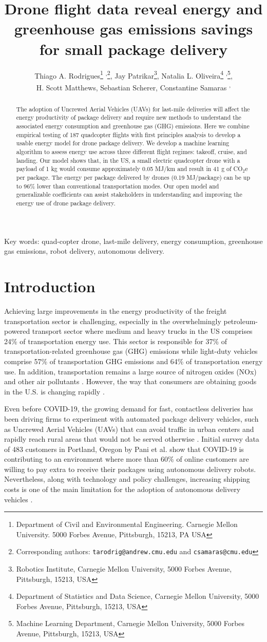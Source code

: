 \documentclass{article}
\title{Drone flight data reveal energy and greenhouse gas emissions savings for small package delivery}
\author{Thiago A. Rodrigues\thanks{Department of Civil and Environmental Engineering. Carnegie Mellon University. 5000 Forbes Avenue, Pittsburgh, 15213, PA USA} \textsuperscript{,}\thanks{Corresponding authors: {\tt\small{tarodrig@andrew.cmu.edu}} and {\tt\small{csamaras@cmu.edu}}}, \;Jay Patrikar\thanks{Robotics Institute, Carnegie Mellon University, 5000 Forbes Avenue, Pittsburgh, 15213, USA}, \;Natalia L. Oliveira\thanks{Department of Statistics and Data Science, Carnegie Mellon University, 5000 Forbes Avenue, Pittsburgh, 15213, USA} \textsuperscript{,}\thanks{Machine Learning Department, Carnegie Mellon University, 5000 Forbes Avenue, Pittsburgh, 15213, USA}, \\H. Scott Matthews\footnotemark[1], \;Sebastian Scherer\footnotemark[3], \;Constantine Samaras \footnotemark[1] \textsuperscript{,} \footnotemark[2]
}
\date{}
\begin{document}
\maketitle

\begin{abstract}
The adoption of Uncrewed Aerial Vehicles (UAVs) for last-mile deliveries will affect the energy productivity of package delivery and require new methods to understand the associated energy consumption and greenhouse gas (GHG) emissions. Here we combine empirical testing of 187 quadcopter flights with first principles analysis to develop a usable energy model for drone package delivery. We develop a machine learning algorithm to assess energy use across three different flight regimes: takeoff, cruise, and landing. Our model shows that, in the US, a small electric quadcopter drone with a payload of 1 kg would consume approximately 0.05 MJ/km and result in 41 g of CO$_{2}$e per package. The energy per package delivered by drones (0.19 MJ/package) can be up to 96\% lower than conventional transportation modes. Our open model and generalizable coefficients can assist stakeholders in understanding and improving the energy use of drone package delivery.
\end{abstract}

Key words: quad-copter drone, last-mile delivery, energy consumption, greenhouse gas emissions, robot delivery, autonomous delivery.

\section{Introduction}

Achieving large improvements in the energy productivity of the freight transportation sector is challenging, especially in the overwhelmingly petroleum-powered transport sector where medium and heavy trucks in the US comprises 24\% of transportation energy use. This sector is responsible for 37\% of transportation-related greenhouse gas (GHG) emissions while light-duty vehicles comprise 57\% of transportation GHG emissions and 64\% of transportation energy use. In addition, transportation remains a large source of nitrogen oxides (NOx) and other air pollutants \cite{Davis2021Transportation39}. However, the way that consumers are obtaining goods in the U.S. is changing rapidly \cite{Dost2018}.

Even before COVID-19, the growing demand for fast, contactless deliveries has been driving firms to experiment with automated package delivery vehicles, such as Uncrewed Aerial Vehicles (UAVs) that can avoid traffic in urban centers and rapidly reach rural areas that would not be served otherwise \cite{Mims2020, Lee2020TheFuture}. Initial survey data of 483 customers in Portland, Oregon by Pani et al. \cite{Pani2020EvaluatingPandemic} show that COVID-19 is contributing to an environment where more than 60\% of online customers are willing to pay extra to receive their packages using autonomous delivery robots. Nevertheless, along with technology and policy challenges, increasing shipping costs is one of the main limitation for the adoption of autonomous delivery vehicles \cite{Kapser2020AcceptancePerceptions}.
\end{document}
